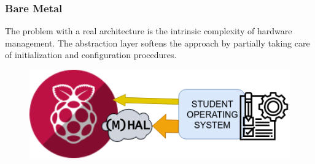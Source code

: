 \documentclass[table,xcdraw]{beamer}
\begin{document}
\begin{frame}[fragile]
    \frametitle{Bare Metal}
    The problem with a real architecture is the intrinsic complexity of hardware
    management. The abstraction layer softens the approach by partially taking care 
    of initialization and configuration procedures.
    \begin{figure}[b]
    \includegraphics[scale=0.7]{raspberrypi.png}
    \end{figure}

\end{frame}
\end{document}
